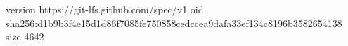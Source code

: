 version https://git-lfs.github.com/spec/v1
oid sha256:d1b9b3f4e15d1d86f7085fe750858cedccea9dafa33ef134c8196b3582654138
size 4642
